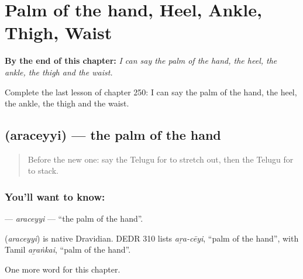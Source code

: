 
\chapter{Palm of the hand, Heel, Ankle, Thigh, Waist}
\label{ch:te-palm-of-the-hand-heel-ankle-thigh-waist}

\begin{chapteropening}
\textbf{By the end of this chapter:} \emph{I can say the palm of the hand, the heel, the ankle, the thigh and the waist.}

Complete the last lesson of chapter 250: I can say the palm of the hand, the heel, the ankle, the thigh and the waist.
\end{chapteropening}

\section[\texorpdfstring{\te{అరచెయ్యి} (araceyyi)}{అరచెయ్యి (araceyyi)}]{ (araceyyi) — the palm of the hand}

\label{lesson:TE-C250-araceyyi}



\begin{quote}
Before the new one: say the Telugu for to stretch out, then the Telugu for to stack.
\end{quote}

\subsection*{You'll want to know: }
\textbf{} — \emph{araceyyi} — \textquotedblleft{}the palm of the hand\textquotedblright{}.

\begin{cousinweb}
\textbf{} (\emph{araceyyi}) is native Dravidian. DEDR 310 lists \emph{aṟa-cēyi}, \textquotedblleft{}palm of the hand\textquotedblright{}, with Tamil \emph{aṟaṅkai}, \textquotedblleft{}palm of the hand\textquotedblright{}.
\end{cousinweb}

\begin{grammarlens}[title={What you've built}]
One more word for this chapter.
\end{grammarlens}

